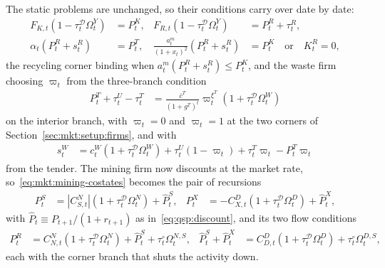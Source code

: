  The static problems are unchanged, so their conditions carry over date by date:
\begin{align}
F_{K,t}\left(1-\tau^{\mathcal D}_t\Omega^Y_t\right) &= P^K_t,
&
F_{R,t}\left(1-\tau^{\mathcal D}_t\Omega^Y_t\right) &= P^R_t+\tau^R_t,
\label{eq:qmkt:final-foc}
\\
\alpha_t\left(P^R_t+s^R_t\right) &= P^T_t,
&
\frac{a^m_t}{\left(1+x_t\right)^2}\left(P^R_t+s^R_t\right) &= P^K_t
\quad\text{or}\quad K^R_t=0,
\label{eq:qmkt:recycler-foc}
\end{align}
the recycling corner binding when $a^m_t\left(P^R_t+s^R_t\right)\le P^K_t$, and the waste firm choosing
$\varpi_t$ from the three-branch condition
\begin{align}
P^T_t+\tau^U_t-\tau^T_t &= \frac{\bar c^T}{\left(1+g^T\right)^t}\varpi_t^{\xi^T}
\left(1+\tau^{\mathcal D}_t\Omega^W_t\right)
\label{eq:qmkt:waste-foc}
\end{align}
on the interior branch, with $\varpi_t=0$ and $\varpi_t=1$ at the two corners of
Section~\ref{sec:mkt:setup:firms}, and with
\begin{align}
s^W_t &= c^W_t\left(1+\tau^{\mathcal D}_t\Omega^W_t\right)+\tau^U_t\left(1-\varpi_t\right)
+\tau^T_t\varpi_t-P^T_t\varpi_t
\label{eq:qmkt:waste-zero-profit}
\end{align}
from the tender. The mining firm now discounts at the market rate, so~\eqref{eq:mkt:mining-costates}
becomes the pair of recursions
\begin{align}
P^S_t &= \left|C^N_{S,t}\right|\left(1+\tau^{\mathcal D}_t\Omega^N_t\right)+\hat P^S_t,
&
P^X_t &= -C^D_{X,t}\left(1+\tau^{\mathcal D}_t\Omega^D_t\right)+\hat P^X_t ,
\label{eq:qmkt:mining-costates}
\end{align}
with $\hat P_t\equiv P_{t+1}/\left(1+r_{t+1}\right)$ as in~\eqref{eq:qsp:discount}, and its two flow
conditions
\begin{align}
P^R_t &= C^N_{N,t}\left(1+\tau^{\mathcal D}_t\Omega^N_t\right)+\hat P^S_t+\tau^{\circ}_t\Omega^{N,S}_t,
&
\hat P^S_t+\hat P^X_t &= C^D_{D,t}\left(1+\tau^{\mathcal D}_t\Omega^D_t\right)+\tau^{\circ}_t\Omega^{D,S}_t,
\label{eq:qmkt:mining-foc}
\end{align}
each with the corner branch that shuts the activity down.

